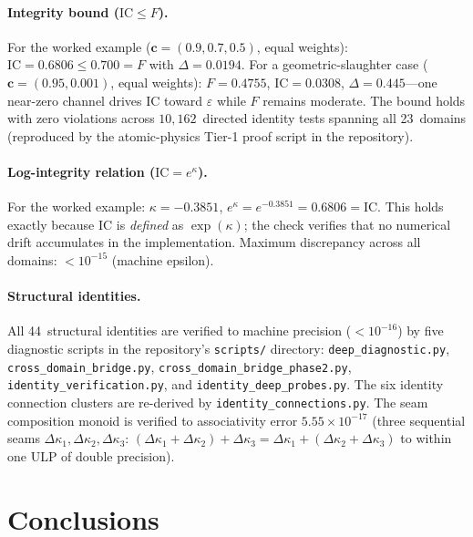 \documentclass[
  aps,
  prd,
  twocolumn,
  superscriptaddress,
  nofootinbib,
  floatfix
]{revtex4-2}
\newcommand{\eps}{\varepsilon}
\newcommand{\tvec}{\mathbf{c}}
\newcommand{\IC}{\mathrm{IC}}
\begin{document}
\paragraph{Integrity bound ($\IC \leq F$).}
For the worked example ($\tvec = (0.9, 0.7, 0.5)$,
equal weights): $\IC = 0.6806 \leq 0.700 = F$ with
$\Delta = 0.0194$.  For a geometric-slaughter case
($\tvec = (0.95, 0.001)$, equal weights): $F = 0.4755$,
$\IC = 0.0308$, $\Delta = 0.445$---one near-zero channel
drives $\IC$ toward $\eps$ while $F$ remains moderate.
The bound holds with zero violations across $10{,}162$~directed
identity tests spanning all 23~domains (reproduced by the
atomic-physics Tier-1 proof script in the repository).

\paragraph{Log-integrity relation ($\IC = e^\kappa$).}
For the worked example: $\kappa = -0.3851$,
$e^\kappa = e^{-0.3851} = 0.6806 = \IC$.  This holds exactly
because $\IC$ is \emph{defined} as $\exp(\kappa)$; the check
verifies that no numerical drift accumulates in the
implementation.  Maximum discrepancy across all domains:
$< 10^{-15}$ (machine epsilon).

\paragraph{Structural identities.}
All 44~structural identities are verified to machine precision
($< 10^{-16}$) by five diagnostic scripts in the repository's
\texttt{scripts/} directory:
\texttt{deep\_diagnostic.py},
\texttt{cross\_domain\_bridge.py},
\texttt{cross\_domain\_bridge\_phase2.py},
\texttt{identity\_verification.py}, and
\texttt{identity\_deep\_probes.py}.
The six identity connection clusters are re-derived by
\texttt{identity\_connections.py}.
The seam composition monoid
is verified to associativity error $5.55 \times 10^{-17}$
(three sequential seams
$\Delta\kappa_1, \Delta\kappa_2, \Delta\kappa_3$:
$(\Delta\kappa_1 {+} \Delta\kappa_2) + \Delta\kappa_3 =
\Delta\kappa_1 + (\Delta\kappa_2 {+} \Delta\kappa_3)$
to within one ULP of double precision).


\section{Conclusions}
\label{sec:conclusions}
\end{document}
